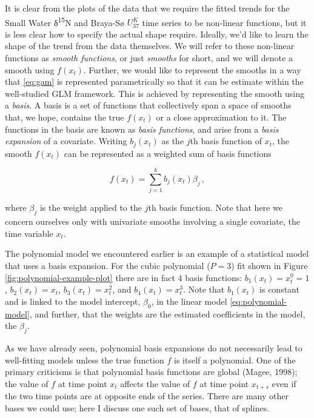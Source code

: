 \documentclass[12pt,]{article}
\newcommand{\uk}{\ensuremath{\mathit{U}^{\mathit{K}}_{\mathup{37}}}}
\begin{document}
It is clear from the plots of the data that we require the fitted trends
for the Small Water δ\textsuperscript{15}N and Braya-Sø \uk{} time
series to be non-linear functions, but it is less clear how to specify
the actual shape require. Ideally, we'd like to learn the shape of the
trend from the data themselves. We will refer to these non-linear
functions as \emph{smooth functions}, or just \emph{smooths} for short,
and we will denote a smooth using \(f(x_t)\). Further, we would like to
represent the smooths in a way that \eqref{eq:gam} is represented
parametrically so that it can be estimate within the well-studied GLM
framework. This is achieved by representing the smooth using a
\emph{basis}. A basis is a set of functions that collectively span a
space of smooths that, we hope, contains the true \(f(x_t)\) or a close
approximation to it. The functions in the basis are known as \emph{basis
functions}, and arise from a \emph{basis expansion} of a covariate.
Writing \(b_j(x_t)\) as the \(j\)th basis function of \(x_t\), the
smooth \(f(x_t)\) can be represented as a weighted sum of basis
functions

\begin{equation*}
f(x_t) = \sum_{j = 1}^{k} b_j(x_t) \beta_j \,,
\end{equation*}

where \(\beta_j\) is the weight applied to the \(j\)th basis function.
Note that here we concern ourselves only with univariate smooths
involving a single covariate, the time variable \(x_t\).

The polynomial model we encountered earlier is an example of a
statistical model that uses a basis expansion. For the cubic polynomial
(\(P = 3\)) fit shown in Figure \ref{fig:polynomial-example-plot} there
are in fact 4 basis functions: \(b_1(x_t) = x_t^0 = 1\),
\(b_2(x_t) = x_t\), \(b_3(x_t) = x^2_t\), and \(b_4(x_t) = x_t^3\). Note
that \(b_1(x_t)\) is constant and is linked to the model intercept,
\(\beta_0\), in the linear model \eqref{eq:polynomial-model}, and
further, that the weights are the estimated coefficients in the model,
the \(\beta_j\).

As we have already seen, polynomial basis expansions do not necessarily
lead to well-fitting models unless the true function \(f\) is itself a
polynomial. One of the primary criticisms is that polynomial basis
functions are global (Magee, 1998); the value of \(f\) at time point
\(x_t\) affects the value of \(f\) at time point \(x_{t+s}\) even if the
two time points are at opposite ends of the series. There are many other
bases we could use; here I discuss one such set of bases, that of
splines.
\end{document}
